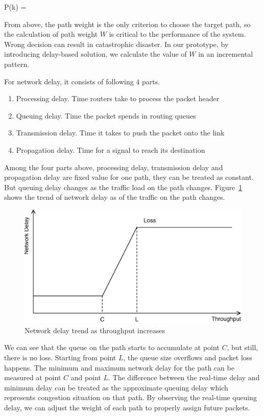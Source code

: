 \be
\label{eq.choose}
P(k) = 
\ee

From above, the path weight is the only criterion to choose the target path, so the calculation of path weight $W$ is critical to the performance of the system. Wrong decision can result in catastrophic disaster. In our prototype, by introducing delay-based solution, we calculate the value of $W$ in an incremental pattern.

For network delay, it consists of following $4$ parts.

\begin{enumerate}
\item Processing delay. Time routers take to process the packet header
\item Queuing delay. Time the packet spends in routing queues
\item Transmission delay. Time it takes to push the packet onto the link
\item Propagation delay. Time for a signal to reach its destination
\end{enumerate}

Among the four parts above, processing delay, transmission delay and propagation delay are fixed value for one path, they can be treated as constant. But queuing delay changes as the traffic load on the path changes. Figure~\ref{fig.delay} shows the trend of network delay as of the traffic on the path changes.

\begin{figure}
\centering
\includegraphics[width=0.8\linewidth]{fig/delay.eps}
\caption{Network delay trend as throughput increases}
\label{fig.delay}
\end{figure}

We can see that the queue on the path starts to accumulate at point $C$, but still, there is no loss. Starting from point $L$, the queue size overflows and packet loss happens. The minimum and maximum network delay for the path can be measured at point $C$ and point $L$. The difference between the real-time delay and minimum delay can be treated as the approximate queuing delay which represents congestion situation on that path. By observing the real-time queuing delay, we can adjust the weight of each path to properly assign future packets.

